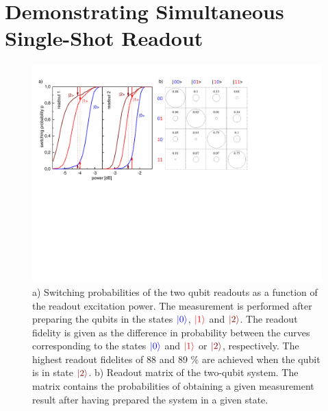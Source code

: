 \section{Demonstrating Simultaneous Single-Shot Readout}

\begin{figure}[ht!]
	\centering
		\includegraphics[width=1.\textwidth]{./material/papers/grover/figures/simultaneous_readout_characteristics}
	\caption[Switching probabilities of the two qubit readouts as a function of the readout excitation power]{a) Switching probabilities of the two qubit readouts as a function of the readout excitation power. The measurement is performed after preparing the qubits in the states $\color{blue}{\left| 0 \right>}$, $\color{red}{\left| 1 \right>}$ and $\color{brown}{\ket{2}}$. The readout fidelity is given as the difference in probability between the curves corresponding to the states $\color{blue}{\left| 0 \right>}$ and $\color{red}{\left| 1 \right>}$ or $\color{brown}{\ket{2}}$, respectively. The highest readout fidelites of 88 and 89 \% are achieved when the qubit is in state $\color{brown}{\ket{2}}$. b) Readout matrix of the two-qubit system. The matrix contains the probabilities of obtaining a given measurement result after having prepared the system in a given state. }
	\label{fig:qubit_readout_characteristics}
\end{figure}

